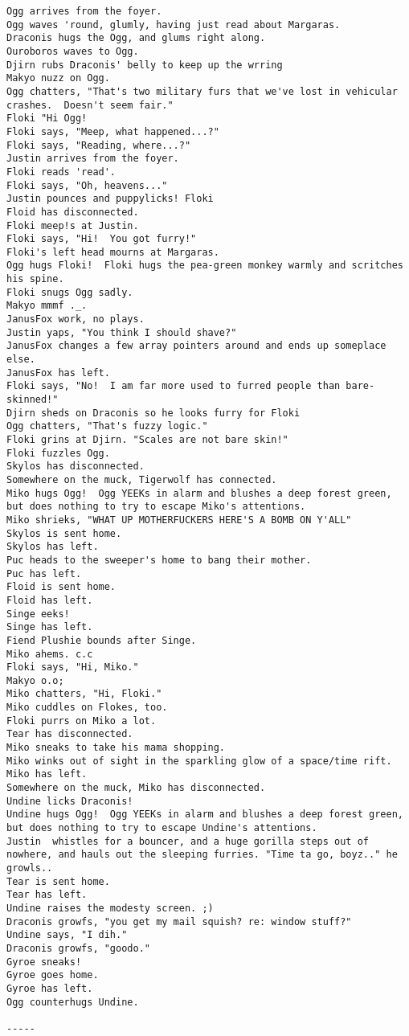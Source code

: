 \begin{verbatim}
Ogg arrives from the foyer.
Ogg waves 'round, glumly, having just read about Margaras.
Draconis hugs the Ogg, and glums right along.
Ouroboros waves to Ogg.
Djirn rubs Draconis' belly to keep up the wrring
Makyo nuzz on Ogg.
Ogg chatters, "That's two military furs that we've lost in vehicular crashes.  Doesn't seem fair."
Floki "Hi Ogg!
Floki says, "Meep, what happened...?"
Floki says, "Reading, where...?"
Justin arrives from the foyer.
Floki reads 'read'.
Floki says, "Oh, heavens..."
Justin pounces and puppylicks! Floki
Floid has disconnected.
Floki meep!s at Justin.
Floki says, "Hi!  You got furry!"
Floki's left head mourns at Margaras.
Ogg hugs Floki!  Floki hugs the pea-green monkey warmly and scritches his spine.
Floki snugs Ogg sadly.
Makyo mmmf ._.
JanusFox work, no plays.
Justin yaps, "You think I should shave?"
JanusFox changes a few array pointers around and ends up someplace else.
JanusFox has left.
Floki says, "No!  I am far more used to furred people than bare-skinned!"
Djirn sheds on Draconis so he looks furry for Floki
Ogg chatters, "That's fuzzy logic."
Floki grins at Djirn. "Scales are not bare skin!"
Floki fuzzles Ogg.
Skylos has disconnected.
Somewhere on the muck, Tigerwolf has connected.
Miko hugs Ogg!  Ogg YEEKs in alarm and blushes a deep forest green, but does nothing to try to escape Miko's attentions.
Miko shrieks, "WHAT UP MOTHERFUCKERS HERE'S A BOMB ON Y'ALL"
Skylos is sent home.
Skylos has left.
Puc heads to the sweeper's home to bang their mother.
Puc has left.
Floid is sent home.
Floid has left.
Singe eeks!
Singe has left.
Fiend Plushie bounds after Singe.
Miko ahems. c.c
Floki says, "Hi, Miko."
Makyo o.o;
Miko chatters, "Hi, Floki."
Miko cuddles on Flokes, too.
Floki purrs on Miko a lot.
Tear has disconnected.
Miko sneaks to take his mama shopping.
Miko winks out of sight in the sparkling glow of a space/time rift.
Miko has left.
Somewhere on the muck, Miko has disconnected.
Undine licks Draconis!
Undine hugs Ogg!  Ogg YEEKs in alarm and blushes a deep forest green, but does nothing to try to escape Undine's attentions.
Justin  whistles for a bouncer, and a huge gorilla steps out of nowhere, and hauls out the sleeping furries. "Time ta go, boyz.." he growls..
Tear is sent home.
Tear has left.
Undine raises the modesty screen. ;)
Draconis growfs, "you get my mail squish? re: window stuff?"
Undine says, "I dih."
Draconis growfs, "goodo."
Gyroe sneaks!
Gyroe goes home.
Gyroe has left.
Ogg counterhugs Undine.

-----


\end{verbatim}
